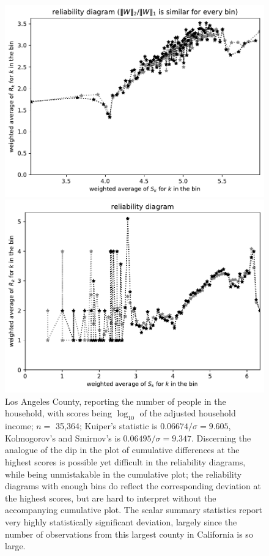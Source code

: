\documentclass{article}
\begin{document}
\begin{figure}
\begin{centering}
\parbox{\imsize}{\includegraphics[width=\imsize]
{./codes/weighted/County_of_Los_Angeles-NP/equierrs100}}
\quad\quad
\parbox{\imsize}{\includegraphics[width=\imsize]
{./codes/weighted/County_of_Los_Angeles-NP/equiscores100}}

\end{centering}
\caption{Los Angeles County, reporting the number of people in the household,
         with scores being $\log_{10}$ of the adjusted household income;
         $n =$ 35,364; Kuiper's statistic is $0.06674 / \sigma = 9.605$,
         Kolmogorov's and Smirnov's is $0.06495 / \sigma = 9.347$.
Discerning the analogue of the dip in the plot
of cumulative differences at the highest scores is possible yet difficult
in the reliability diagrams, while being unmistakable in the cumulative plot;
the reliability diagrams with enough bins do reflect
the corresponding deviation at the highest scores, but are hard to interpret
without the accompanying cumulative plot. The scalar summary statistics
report very highly statistically significant deviation,
largely since the number of observations from this largest county in California
is so large.
}
\label{los_angeles}
\end{figure}
\end{document}
